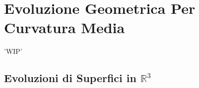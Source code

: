 \chapter{Evoluzione Geometrica Per Curvatura Media}
'WIP'

\section{Evoluzioni di Superfici in $\mathbb{R}^3$}
